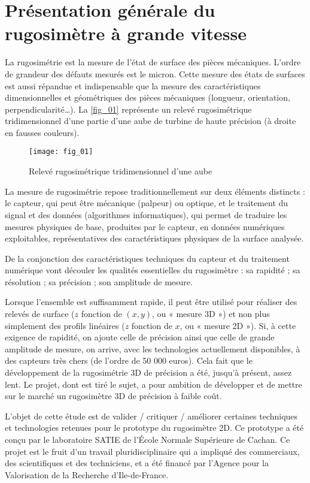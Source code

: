 
\section{Présentation générale du rugosimètre à grande vitesse}
\ifprof
\else
La rugosimétrie est la mesure de l’état de surface des pièces mécaniques. L’ordre de grandeur des défauts
mesurés est le micron. Cette mesure des états de surfaces est aussi répandue et indispensable que la mesure
des caractéristiques dimensionnelles et géométriques des pièces mécaniques (longueur, orientation,
perpendicularité…). La \autoref{fig_01} représente un relevé rugosimétrique tridimensionnel d’une partie d’une
aube de turbine de haute précision (à droite en fausses couleurs).


\begin{figure}[H]
\centering
\texttt{[image: fig\_01]}
\caption{\label{fig_01} Relevé rugosimétrique tridimensionnel d’une aube}
\end{figure}

La mesure de rugosimétrie repose traditionnellement sur deux éléments distincts : le capteur, qui peut être
mécanique (palpeur) ou optique, et le traitement du signal et des données (algorithmes informatiques), qui
permet de traduire les mesures physiques de base, produites par le capteur, en données numériques
exploitables, représentatives des caractéristiques physiques de la surface analysée.


De la conjonction des caractéristiques techniques du capteur et du traitement numérique vont découler les
qualités essentielles du rugosimètre : sa rapidité ; sa résolution ; sa précision ; son amplitude de mesure.

Lorsque l’ensemble est suffisamment rapide, il peut être utilisé pour réaliser des relevés de surface
($z$ fonction de $(x, y)$, ou « mesure 3D ») et non plus simplement des profils linéaires ($z$ fonction de $x$, ou
« mesure 2D »). Si, à cette exigence de rapidité, on ajoute celle de précision ainsi que celle de grande
amplitude de mesure, on arrive, avec les technologies actuellement disponibles, à des capteurs très chers
(de l’ordre de 50 000 euros). Cela fait que le développement de la rugosimétrie 3D de précision a été,
jusqu'à présent, assez lent. Le projet, dont est tiré le sujet, a pour ambition de développer et de mettre sur le
marché un rugosimètre 3D de précision à faible coût.

L’objet de cette étude est de valider / critiquer / améliorer certaines techniques et technologies retenues
pour le prototype du rugosimètre 2D. Ce prototype a été conçu par le laboratoire SATIE de l’École
Normale Supérieure de Cachan. Ce projet est le fruit d’un travail pluridisciplinaire qui a impliqué des
commerciaux, des scientifiques et des techniciens, et a été financé par l’Agence pour la Valorisation de la
Recherche d’Ile-de-France.
\fi
